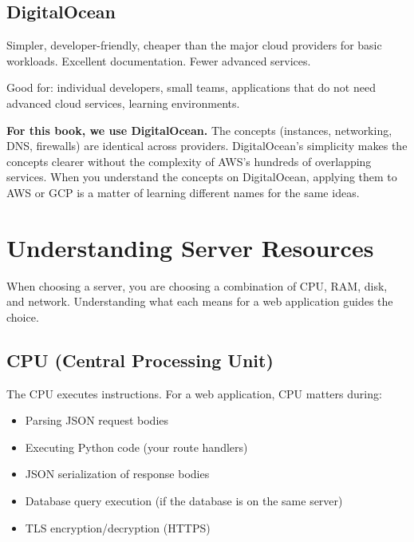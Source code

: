 \subsection*{DigitalOcean}\label{20-server-fundamentals:digitalocean}

Simpler, developer-friendly, cheaper than the major cloud providers for basic workloads. Excellent documentation. Fewer advanced services.

Good for: individual developers, small teams, applications that do not need advanced cloud services, learning environments.

\textbf{For this book, we use DigitalOcean.} The concepts (instances, networking, DNS, firewalls) are identical across providers. DigitalOcean's simplicity makes the concepts clearer without the complexity of AWS's hundreds of overlapping services. When you understand the concepts on DigitalOcean, applying them to AWS or GCP is a matter of learning different names for the same ideas.

\setcounter{section}{3}
\section{Understanding Server Resources}\label{20-server-fundamentals:204-understanding-server-resources}

When choosing a server, you are choosing a combination of CPU, RAM, disk, and network. Understanding what each means for a web application guides the choice.

\subsection*{CPU (Central Processing Unit)}\label{20-server-fundamentals:cpu-central-processing-unit}

The CPU executes instructions. For a web application, CPU matters during:

\begin{itemize}
\tightlist
\item
  Parsing JSON request bodies
\item
  Executing Python code (your route handlers)
\item
  JSON serialization of response bodies
\item
  Database query execution (if the database is on the same server)
\item
  TLS encryption/decryption (HTTPS)
\end{itemize}

